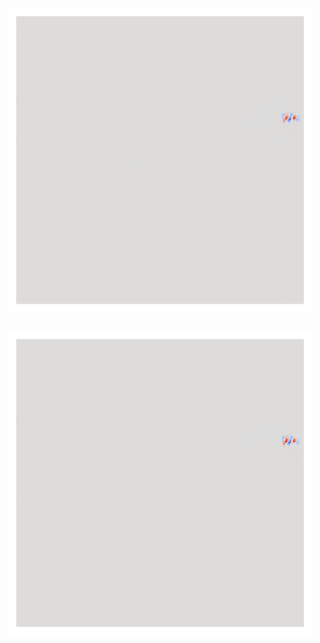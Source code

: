 \begin{figure}[H]
\begin{subfigure}{0.095\linewidth}
    \end{subfigure}\hfill%
    \begin{subfigure}{0.095\linewidth}
        \centering
        \includegraphics[height=1\linewidth]{01-images/05-resultate/uap_resnet18/uap0-resnet18-covidx_data-n200-robustificationslevel8.png}
    \end{subfigure}\hfill%
    \begin{subfigure}{0.095\linewidth}
        \centering
        \includegraphics[height=1\linewidth]{01-images/05-resultate/uap_resnet18/uap0-resnet18-covidx_data-n200-robustificationslevel9.png}

\end{subfigure}
\end{figure}
